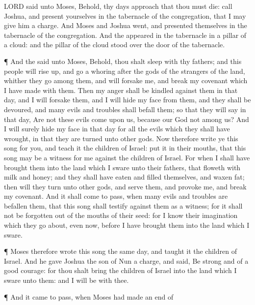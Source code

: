 {{{LORD}}
said unto
Moses, Behold, thy
days
approach that thou must
die:
call
Joshua, and
present yourselves in the
tabernacle of the
congregation, that I may give him a
charge. And
Moses and
Joshua
went, and
presented themselves in the
tabernacle of the
congregation.
And the
{}
appeared in the
tabernacle in a
pillar of a
cloud: and the
pillar of the
cloud
stood over the
door of the
tabernacle.
\par }{\PP {}¶ And the
{}
said unto
Moses, Behold, thou shalt
sleep with thy
fathers; and this
people will rise
up, and go a
whoring
after the
gods of the
strangers of the
land, whither they
go
{}
among them, and will
forsake me, and
break my
covenant which I have
made with them.
Then my
anger shall be
kindled against them in that
day, and I will
forsake them, and I will
hide my
face from them, and they shall be
devoured, and
many
evils and
troubles shall
befall them; so that they will
say in that
day, Are not these
evils
come upon us, because our
God
{} not
among us?
And I will
surely
hide my
face in that
day for all the
evils which they shall have
wrought, in
that they are
turned unto
other
gods.
Now therefore
write ye this
song for you, and
teach it the
children of
Israel:
put it in their
mouths, that this
song may be a
witness for me against the
children of
Israel.
For when I shall have
brought them into the
land which I
sware unto their
fathers, that
floweth with
milk and
honey; and they shall have
eaten and
filled themselves, and waxen
fat; then will they
turn unto
other
gods, and
serve them, and
provoke me, and
break my
covenant.
And it shall come to pass, when
many
evils and
troubles are
befallen them, that this
song shall
testify
against them as a
witness; for it shall not be
forgotten out of the
mouths of their
seed: for I
know their
imagination which they go
about, even
now, before I have
brought them into the
land which I
sware.
\par }{\PP {}¶
Moses therefore
wrote this
song the same
day, and
taught it the
children of
Israel.
And he gave
Joshua the
son of
Nun a
charge, and
said, Be
strong and of a good
courage: for thou shalt
bring the
children of
Israel into the
land which I
sware unto them: and I will be with thee.
\par }{\PP {}¶ And it came to pass, when
Moses had made an
end of
}
